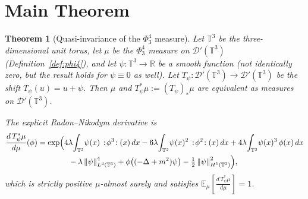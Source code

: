 \documentclass[11pt,a4paper]{article}
\newtheorem{theorem}{Theorem}[section]
\theoremstyle{definition}
\newcommand{\T}{\mathbb{T}}
\newcommand{\R}{\mathbb{R}}
\newcommand{\E}{\mathbb{E}}
\newcommand{\Dc}{\mathcal{D}}
\newcommand{\norm}[1]{\left\|#1\right\|}
\newcommand{\wick}[1]{:\!#1\!:}
\begin{document}
\section{Main Theorem}

\begin{theorem}[Quasi-invariance of the $\Phi^4_3$ measure]\label{thm:main}
Let $\T^3$ be the three-dimensional unit torus, let $\mu$ be the $\Phi^4_3$ measure on $\Dc'(\T^3)$ (Definition~\ref{def:phi4}), and let $\psi:\T^3\to\R$ be a smooth function (not identically zero, but the result holds for $\psi\equiv 0$ as well).
Let $T_\psi:\Dc'(\T^3)\to\Dc'(\T^3)$ be the shift $T_\psi(u)=u+\psi$.
Then $\mu$ and $T_\psi^*\mu := (T_\psi)_*\mu$ are \emph{equivalent} as measures on $\Dc'(\T^3)$.

The explicit Radon--Nikodym derivative is
\begin{align}
\frac{d\,T_\psi^*\mu}{d\mu}(\phi)
&= \exp\Bigl(
   4\lambda\!\int_{\T^3}\!\psi(x)\,\wick{\phi^3}(x)\,dx
   - 6\lambda\!\int_{\T^3}\!\psi(x)^2\,\wick{\phi^2}(x)\,dx
   + 4\lambda\!\int_{\T^3}\!\psi(x)^3\,\phi(x)\,dx
   \nonumber\\
&\qquad\qquad
   - \lambda\norm{\psi}_{L^4(\T^3)}^4
   + \phi\bigl((-\Delta+m^2)\psi\bigr)
   - \tfrac{1}{2}\norm{\psi}_{H^1(\T^3)}^2
\Bigr),\label{eq:RN_full}
\end{align}
which is strictly positive $\mu$-almost surely and satisfies $\E_\mu[\tfrac{d\,T_\psi^*\mu}{d\mu}]=1$.
\end{theorem}
\end{document}
